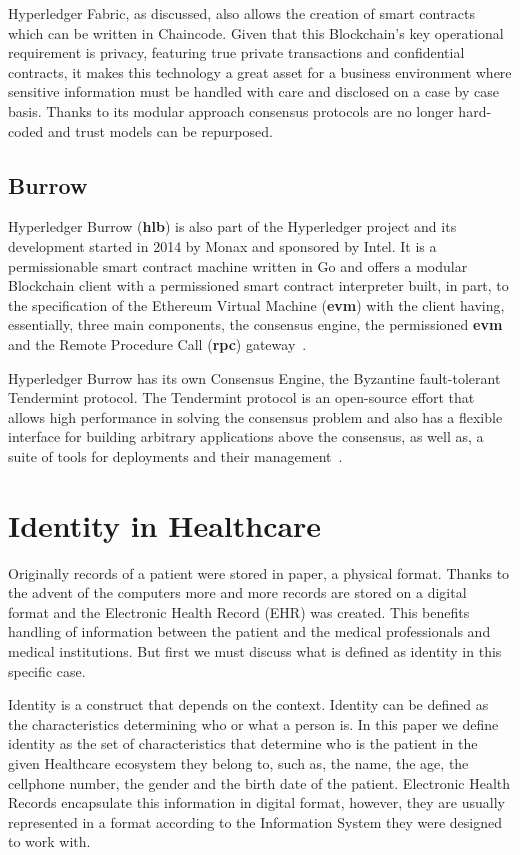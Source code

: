 Hyperledger Fabric, as discussed, also allows the creation of smart contracts
which can be written in Chaincode.  Given that this Blockchain's key
operational requirement is privacy, featuring true private transactions and
confidential contracts, it makes this technology a great asset for a business
environment where sensitive information must be handled with care and disclosed
on a case by case basis.  Thanks to its modular approach consensus protocols
are no longer hard-coded and trust models can be repurposed.

\subsection{Burrow}

Hyperledger Burrow (\textbf{hlb}) is also part of the Hyperledger project and
its development started in 2014 by Monax and sponsored by Intel. It is a
permissionable smart contract machine written in Go and offers a modular
Blockchain client with a permissioned smart contract interpreter built, in
part, to the specification of the Ethereum Virtual Machine (\textbf{evm}) with
the client having, essentially, three main components, the consensus engine,
the permissioned \textbf{evm} and the Remote Procedure Call (\textbf{rpc})
gateway~\cite{Kuhlman2017,HyperledgerBurrow2017}.

Hyperledger Burrow has its own Consensus Engine, the Byzantine fault-tolerant
Tendermint protocol.  The Tendermint protocol is an open-source effort that
allows high performance in solving the consensus problem and also has a
flexible interface for building arbitrary applications above the consensus, as
well as, a suite of tools for deployments and their
management~\cite{Buchman2016}.

\section{Identity in Healthcare}

Originally records of a patient were stored in paper, a physical format.
Thanks to the advent of the computers more and more records are stored on a
digital format and the Electronic Health Record (EHR) was created.
\cite{Marquez2017}  This benefits handling of information between the patient
and the medical professionals and medical institutions.\cite{ONCoordinator2017}
But first we must discuss what is defined as identity in this specific case.

Identity is a construct that depends on the context.  Identity can be defined
as the characteristics determining who or what a person is.  In this paper we
define identity as the set of characteristics that determine who is the patient
in the given Healthcare ecosystem they belong to, such as, the name, the age,
the cellphone number, the gender and the birth date of the patient.  Electronic
Health Records encapsulate this information in digital format, however, they
are usually represented in a format according to the Information System they
were designed to work with.

